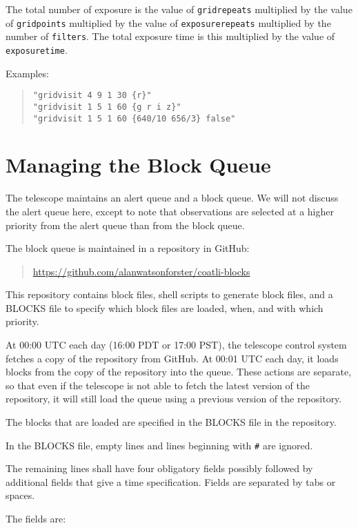 The total number of exposure is the value of \verb|gridrepeats| multiplied by the value of \verb|gridpoints| multiplied by the value of \verb|exposurerepeats| multiplied by the number of \verb|filters|. The total exposure time is this multiplied by the value of \verb|exposuretime|.

Examples:
\begin{quote}
\begin{verbatim}
"gridvisit 4 9 1 30 {r}"
"gridvisit 1 5 1 60 {g r i z}"
"gridvisit 1 5 1 60 {640/10 656/3} false"
\end{verbatim}
\end{quote}

\section{Managing the Block Queue}

The telescope maintains an alert queue and a block queue. We will not discuss the alert queue here, except to note that observations are selected at a higher priority from the alert queue than from the block queue.

The block queue is maintained in a repository in GitHub:
\begin{quote}
\ifcoatli
\url{https://github.com/alanwatsonforster/coatli-blocks}
\fi    
\end{quote}
This repository contains block files, shell scripts to generate block files, and a BLOCKS file to specify which block files are loaded, when, and with which priority.

At 00:00 UTC each day (16:00 PDT or 17:00 PST), the telescope control system fetches a copy of the repository from GitHub. At 00:01 UTC each day, it loads blocks from the copy of the repository into the queue. These actions are separate, so that even if the telescope is not able to fetch the latest version of the repository, it will still load the queue using a previous version of the repository.

The blocks that are loaded are specified in the BLOCKS file in the repository. 

In the BLOCKS file, empty lines and lines beginning with \verb|#| are ignored.

The remaining lines shall have four obligatory fields possibly followed by additional fields that give a time specification. Fields are separated by tabs or spaces.

The fields are:

